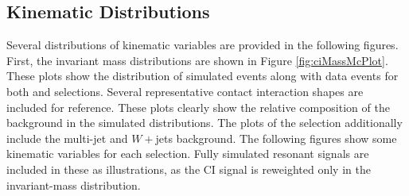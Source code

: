 \subsection{Kinematic Distributions}

Several distributions of kinematic variables are provided in the following figures.
First, the invariant mass distributions are shown in Figure \ref{fig:ciMassMcPlot}.
These plots show the distribution of simulated events along with data events for both \ee and \mm selections.
Several representative contact interaction shapes are included for reference.
These plots clearly show the relative composition of the background in the simulated distributions.
The plots of the \ee selection additionally include the multi-jet and $W+$jets background.
The following figures show some kinematic variables for each selection.
Fully simulated resonant signals are included in these as illustrations, as the CI signal is reweighted only in the invariant-mass distribution.


